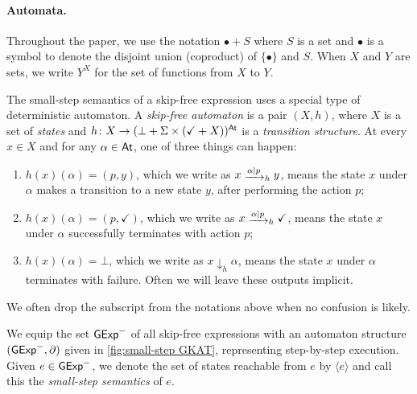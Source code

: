 \documentclass[orivec,envcountsect,envcountsame]{llncs}
\begin{document}
    \paragraph{\bf Automata.}
    Throughout the paper, we use the notation $\bullet + S$ where $S$ is a set and $\bullet$ is a symbol to denote the disjoint union (coproduct) of $\{ \bullet \}$ and $S$.
    When $X$ and $Y$ are sets, we write $Y^X$ for the set of functions from $X$ to $Y$.

    The small-step semantics of a skip-free  \GKAT expression uses a special type of deterministic automaton.
    A \emph{skip-free automaton} is a pair $(X,h)$, where $X$ is a set of \emph{states} and $h\colon X \to (\bot + \Sigma\times(\checkmark + X))^{\mathsf{At}}$ is a \emph{transition structure}.
    At every \(x \in X\) and for any $\alpha \in \mathsf{At}$, one of three things can happen:
    \begin{enumerate}
        \item \(h(x)(\alpha) = (p, y)\), which we write as \(x \tr{\alpha \mid p}_h y\), means the state $x$ under $\alpha$ makes a transition to a new state $y$, after performing the action $p$;
        \item  \(h(x)(\alpha) = (p, \checkmark)\), which we write as \(x \tr{\alpha \mid p}_h \checkmark\), means the state $x$ under $\alpha$ successfully terminates with action $p$;
        \item \(h(x)(\alpha) = \bot\), which we write as \(x \downarrow_h \alpha\), means the state $x$ under $\alpha$ terminates with failure.
        Often we will leave these outputs implicit.
    \end{enumerate}
    We often drop the subscript from the notations above when no confusion is likely.

    \begin{definition}\label{def:autexp}
        We equip the set \(\mathsf{GExp}^-\) of all skip-free  \GKAT expressions with an automaton structure \((\mathsf{GExp}^-, \partial)\) given in \cref{fig:small-step GKAT}, representing step-by-step execution.
        Given \(e \in \mathsf{GExp}^-\),  we denote the set of states reachable from \(e\) by \(\langle e\rangle\) and call this the \emph{small-step semantics} of \(e\).
    \end{definition}
\end{document}
